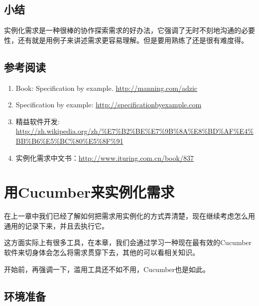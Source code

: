 \section{小结}
\label{小结}

实例化需求是一种很棒的协作探索需求的好办法，它强调了无时不刻地沟通的必要性，还有就是用例子来讲述需求更容易理解。但是要用熟练了还是很有难度得。

\section{参考阅读}
\label{参考阅读}

\begin{enumerate}
\item Book: Specification by example. \href{http://manning.com/adzic}{http:/\slash manning.com\slash adzic}

\item Specification by example: \href{http://specificationbyexample.com}{http:/\slash specificationbyexample.com}

\item 精益软件开发: \href{http://zh.wikipedia.org/zh/%E7%B2%BE%E7%9B%8A%E8%BD%AF%E4%BB%B6%E5%BC%80%E5%8F%91}{http:/\slash zh.wikipedia.org\slash zh\slash \%E7\%B2\%BE\%E7\%9B\%8A\%E8\%BD\%AF\%E4\%BB\%B6\%E5\%BC\%80\%E5\%8F\%91}

\item 实例化需求中文书：\href{http://www.ituring.com.cn/book/837}{http:/\slash www.ituring.com.cn\slash book\slash 837}

\end{enumerate}

\chapter{用Cucumber来实例化需求}
\label{用cucumber来实例化需求}

在上一章中我们已经了解如何把需求用实例化的方式弄清楚，现在继续考虑怎么用通用的记录下来，并且去执行它。

这方面实际上有很多工具，在本章，我们会通过学习一种现在最有效的Cucumber软件来切身体会怎么将需求贯穿下去，其他的可以看相关知识。

开始前，再强调一下，滥用工具还不如不用，Cucumber也是如此。

\section{环境准备}
\label{环境准备}


